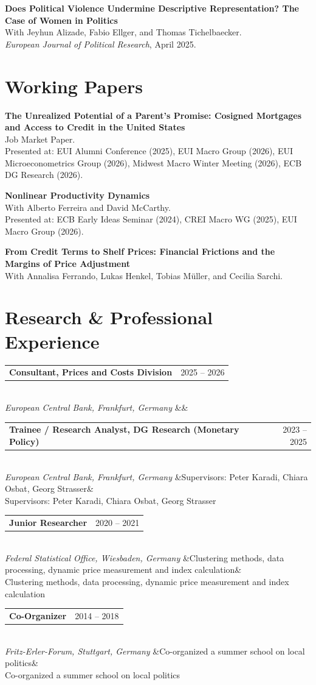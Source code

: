 \documentclass[11pt,a4paper]{article}
\makeatletter
\newcommand{\daterow}[2]{%
  \begin{tabularx}{\textwidth}{@{}X r@{}}
    #1 & #2
  \end{tabularx}%
}
\newcommand{\entry}[4]{%
  \daterow{\textbf{#1}}{#3}\\[1pt]
  \textit{#2}%
  \ifx&#4&%
  \else
    \\[1pt]#4%
  \fi
  \vspace{0.6em}
}
\newcommand{\paper}[2]{%
  \textbf{#1}\\[1pt]
  #2
  \vspace{0.6em}
}
\makeatother
\begin{document}
\paper{Does Political Violence Undermine Descriptive Representation? The Case of Women in Politics}{With Jeyhun Alizade, Fabio Ellger, and Thomas Tichelbaecker.\\ \textit{European Journal of Political Research}, April 2025.}

\section{Working Papers}

\paper{The Unrealized Potential of a Parent's Promise: Cosigned Mortgages and Access to Credit in the United States}{Job Market Paper.\\ Presented at: EUI Alumni Conference (2025), EUI Macro Group (2026), EUI Microeconometrics Group (2026), Midwest Macro Winter Meeting (2026), ECB DG Research (2026).}

\paper{Nonlinear Productivity Dynamics}{With Alberto Ferreira and David McCarthy.\\ Presented at: ECB Early Ideas Seminar (2024), CREI Macro WG (2025), EUI Macro Group (2026).}

\paper{From Credit Terms to Shelf Prices: Financial Frictions and the Margins of Price Adjustment}{With Annalisa Ferrando, Lukas Henkel, Tobias Müller, and Cecilia Sarchi.}

\section{Research \& Professional Experience}

\entry{Consultant, Prices and Costs Division}{European Central Bank, Frankfurt, Germany}{2025 -- 2026}{}

\entry{Trainee / Research Analyst, DG Research (Monetary Policy)}{European Central Bank, Frankfurt, Germany}{2023 -- 2025}{Supervisors: Peter Karadi, Chiara Osbat, Georg Strasser}

\entry{Junior Researcher}{Federal Statistical Office, Wiesbaden, Germany}{2020 -- 2021}{Clustering methods, data processing, dynamic price measurement and index calculation}

\entry{Co-Organizer}{Fritz-Erler-Forum, Stuttgart, Germany}{2014 -- 2018}{Co-organized a summer school on local politics}
\end{document}
